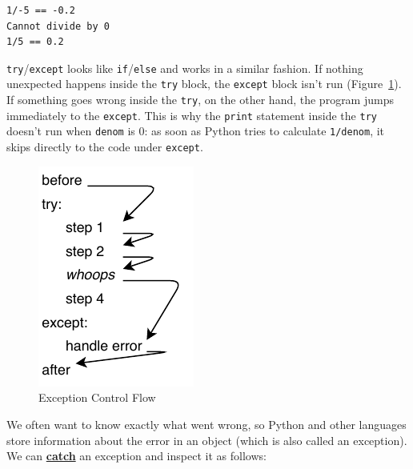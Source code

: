 \documentclass[
]{krantz}
\newcommand{\gref}[2]{\hyperlink{#2}{\textbf{#1}}}
\begin{document}
\begin{verbatim}
1/-5 == -0.2
Cannot divide by 0
1/5 == 0.2
\end{verbatim}

\texttt{try}/\texttt{except} looks like \texttt{if}/\texttt{else} and works in a similar fashion.
If nothing unexpected happens inside the \texttt{try} block,
the \texttt{except} block isn't run (Figure~\ref{fig:errors-control-flow}).
If something goes wrong inside the \texttt{try},
on the other hand,
the program jumps immediately to the \texttt{except}.
This is why the \texttt{print} statement inside the \texttt{try} doesn't run when \texttt{denom} is 0:
as soon as Python tries to calculate \texttt{1/denom},
it skips directly to the code under \texttt{except}.

\begin{figure}

{\centering \includegraphics[width=0.4\linewidth]{figures/errors/exceptions} 

}

\caption{Exception Control Flow}\label{fig:errors-control-flow}
\end{figure}

We often want to know exactly what went wrong,
so Python and other languages store information about the error
in an object (which is also called an exception).
We can \gref{catch}{catch\_exception} an exception and inspect it as follows:
\end{document}
